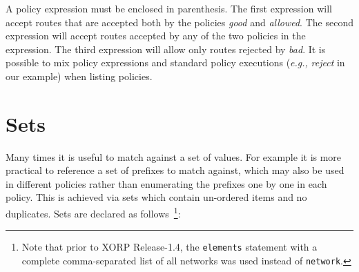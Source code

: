 \noindent{}

A policy expression must be enclosed in parenthesis.  The first expression will
accept routes that are accepted both by the policies {\em good} and {\em
allowed}.  The second expression will accept routes accepted by any of the two
policies in the expression.  The third expression will allow only routes
rejected by {\em bad}.  It is possible to mix policy expressions and standard
policy executions ({\em e.g.,} {\em reject} in our example) when listing
policies.

\section{Sets}
Many times it is useful to match against a set of values.  For example it is
more practical to reference a set of prefixes to match against, which may also
be used in different policies rather than enumerating the prefixes one by one in
each policy.  This is achieved via sets which contain un-ordered items and no
duplicates.  Sets are declared as follows~\footnote{Note that prior to XORP
Release-1.4, the {\tt elements} statement with a complete comma-separated
list of all networks was used instead of {\tt network}.}:

\noindent{}

